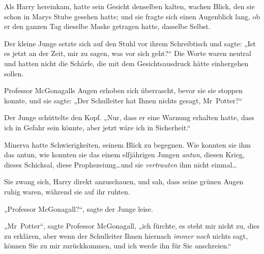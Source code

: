 Als Harry hereinkam, hatte sein Gesicht denselben kalten, wachen Blick, den sie schon in Marys Stube gesehen hatte; und sie fragte sich einen Augenblick lang, ob er den ganzen Tag dieselbe Maske getragen hatte, dasselbe Selbst.

Der kleine Junge setzte sich auf den Stuhl vor ihrem Schreibtisch und sagte:
„Ist es jetzt an der Zeit, mir zu sagen, was vor sich geht?“ Die Worte waren neutral und hatten nicht die Schärfe, die mit dem Gesichtsausdruck hätte einhergehen sollen.

Professor McGonagalls Augen erhoben sich überrascht, bevor sie sie stoppen konnte, und sie sagte:
„Der Schulleiter hat Ihnen nichts gesagt, Mr~Potter?“

Der Junge schüttelte den Kopf.
„Nur, dass er eine Warnung erhalten hatte, dass ich in Gefahr sein könnte, aber jetzt wäre ich in Sicherheit.“

Minerva hatte Schwierigkeiten, seinem Blick zu begegnen. Wie konnten sie ihm das antun, wie konnten sie das einem elfjährigen Jungen \emph{antun}, diesen Krieg, dieses Schicksal, diese Prophezeiung…und sie \emph{vertrauten} ihm nicht einmal…

Sie zwang sich, Harry direkt anzuschauen, und sah, dass seine grünen Augen ruhig waren, während sie auf ihr ruhten.

„Professor McGonagall?“, sagte der Junge leise.

„Mr~Potter“, sagte Professor McGonagall, „ich fürchte, es steht mir nicht zu, dies zu erklären, aber wenn der Schulleiter Ihnen hiernach \emph{immer} \emph{noch} nichts sagt, können Sie zu mir zurückkommen, und ich werde ihn für Sie anschreien.“

